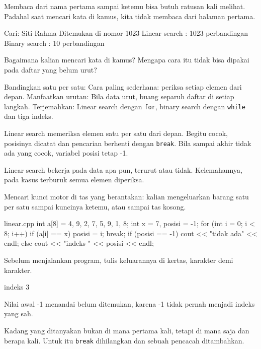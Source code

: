\documentclass[a4paper]{article}
\begin{document}
Membaca dari nama pertama sampai ketemu bisa butuh ratusan kali melihat. Padahal saat mencari kata di kamus, kita tidak membaca dari halaman pertama.

\begin{MKeluaran}[title={Tampilan yang diinginkan}]
Cari: Siti Rahma
Ditemukan di nomor 1023
Linear search : 1023 perbandingan
Binary search : 10 perbandingan
\end{MKeluaran}
\begin{Tebak}
Bagaimana kalian mencari kata di kamus? Mengapa cara itu tidak bisa dipakai pada daftar yang belum urut?
\end{Tebak}
\begin{Jawaban}
Bandingkan satu per satu: Cara paling sederhana: periksa setiap elemen dari depan. Manfaatkan urutan: Bila data urut, buang separuh daftar di setiap langkah. Terjemahkan: Linear search dengan \texttt{for}, binary search dengan \texttt{while} dan tiga indeks.
\end{Jawaban}
Linear search memeriksa elemen satu per satu dari depan. Begitu cocok, posisinya dicatat dan pencarian berhenti dengan \texttt{break}. Bila sampai akhir tidak ada yang cocok, variabel posisi tetap -1.

Linear search bekerja pada data apa pun, terurut atau tidak. Kelemahannya, pada kasus terburuk semua elemen diperiksa.

\begin{Contoh}
Mencari kunci motor di tas yang berantakan: kalian mengeluarkan barang satu per satu sampai kuncinya ketemu, atau sampai tas kosong.
\end{Contoh}
\begin{MKode}{linear.cpp}
int a[8] = {4, 9, 2, 7, 5, 9, 1, 8};
int x = 7, posisi = -1;
for (int i = 0; i < 8; i++) {
    if (a[i] == x) {
        posisi = i;
        break;
    }
}
if (posisi == -1) cout << "tidak ada" << endl;
else cout << "indeks " << posisi << endl;
\end{MKode}
\begin{Tebak}[]
Sebelum menjalankan program, tulis keluarannya di kertas, karakter demi karakter.
\end{Tebak}
\begin{Jawaban}[]
\begin{MKeluaran}[]
indeks 3
\end{MKeluaran}
Nilai awal -1 menandai belum ditemukan, karena -1 tidak pernah menjadi indeks yang sah.
\end{Jawaban}
Kadang yang ditanyakan bukan di mana pertama kali, tetapi di mana saja dan berapa kali. Untuk itu \texttt{break} dihilangkan dan sebuah pencacah ditambahkan.
\end{document}
